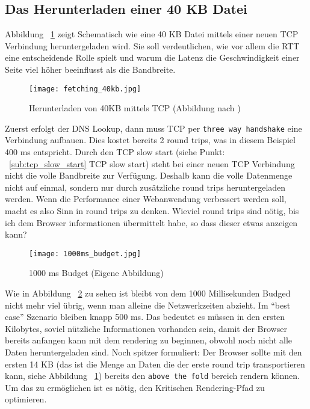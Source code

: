 
	\subsection{Das Herunterladen einer 40 KB Datei} %
	\label{sub:das_herunterladen_einer_40_kb_datei}

		Abbildung ~\ref{fig:fetching_40kb} zeigt Schematisch wie eine 40 KB Datei mittels einer neuen TCP Verbindung heruntergeladen wird. Sie soll verdeutlichen, wie vor allem die RTT eine entscheidende Rolle spielt und warum die Latenz die Geschwindigkeit einer Seite viel höher beeinflusst als die Bandbreite.

		\begin{figure}[htbp]
			\begin{center}
				\texttt{[image: fetching\_40kb.jpg]}
				\caption{Herunterladen von 40KB mittels TCP (Abbildung nach \autocite{grigorikTCP})}
				\label{fig:fetching_40kb}
			\end{center}
		\end{figure}

		Zuerst erfolgt der DNS Lookup, dann muss TCP per \texttt{three way handshake} eine Verbindung aufbauen. Dies kostet bereits 2 round trips, was in diesem Beispiel 400 ms entspricht.
		Durch den TCP slow start (siehe Punkt: ~\ref{sub:tcp_slow_start} TCP slow start) steht bei einer neuen TCP Verbindung nicht die volle Bandbreite zur Verfügung. Deshalb kann die volle Datenmenge nicht auf einmal, sondern nur durch zusätzliche round trips heruntergeladen werden. Wenn die Performance einer Webanwendung verbessert werden soll, macht es also Sinn in round trips zu denken. Wieviel round trips sind nötig, bis ich dem Browser informationen übermittelt habe, so dass dieser etwas anzeigen kann? 
		
		\begin{figure}[htbp]
			\begin{center}
				\texttt{[image: 1000ms\_budget.jpg]}
				\caption{1000 ms Budget (Eigene Abbildung)}
				\label{fig:1000ms_budget}
			\end{center}
		\end{figure}

		Wie in Abbildung ~\ref{fig:1000ms_budget} zu sehen ist bleibt von dem 1000 Millisekunden Budged nicht mehr viel übrig, wenn man alleine die Netzwerkzeiten abzieht. Im "`best case"' Szenario bleiben knapp 500 ms.
		Das bedeutet es müssen in den ersten Kilobytes, soviel nützliche Informationen vorhanden sein, damit der Browser bereits anfangen kann mit dem rendering zu beginnen, obwohl noch nicht alle Daten heruntergeladen sind. Noch spitzer formuliert: Der Browser sollte mit den ersten 14 KB (das ist die Menge an Daten die der erste round trip transportieren kann, siehe Abbildung ~\ref{fig:fetching_40kb}) bereits den \texttt{above the fold} bereich rendern können. Um das zu ermöglichen ist es nötig, den Kritischen Rendering-Pfad zu optimieren.
		
